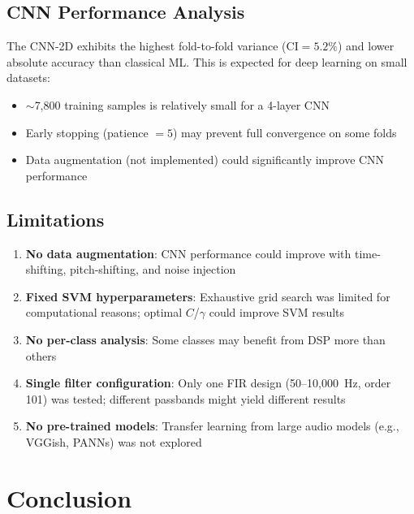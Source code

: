 \documentclass[conference]{IEEEtran}
\begin{document}
\subsection{CNN Performance Analysis}

The CNN-2D exhibits the highest fold-to-fold variance ($\text{CI} = 5.2\%$) and lower absolute accuracy than classical ML. This is expected for deep learning on small datasets:
\begin{itemize}
    \item $\sim$7,800 training samples is relatively small for a 4-layer CNN
    \item Early stopping (patience $= 5$) may prevent full convergence on some folds
    \item Data augmentation (not implemented) could significantly improve CNN performance
\end{itemize}

\subsection{Limitations}

\begin{enumerate}
    \item \textbf{No data augmentation}: CNN performance could improve with time-shifting, pitch-shifting, and noise injection
    \item \textbf{Fixed SVM hyperparameters}: Exhaustive grid search was limited for computational reasons; optimal $C$/$\gamma$ could improve SVM results
    \item \textbf{No per-class analysis}: Some classes may benefit from DSP more than others
    \item \textbf{Single filter configuration}: Only one FIR design (50--10,000~Hz, order 101) was tested; different passbands might yield different results
    \item \textbf{No pre-trained models}: Transfer learning from large audio models (e.g., VGGish, PANNs) was not explored
\end{enumerate}

\section{Conclusion}
\label{sec:conclusion}
\end{document}
